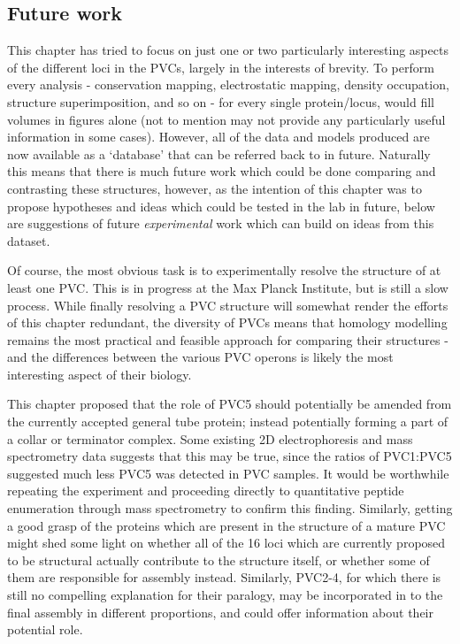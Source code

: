 \subsection{Future work}
This chapter has tried to focus on just one or two particularly interesting aspects of the different loci in the PVCs, largely in the interests of brevity. To perform every analysis - conservation mapping, electrostatic mapping, density occupation, structure superimposition, and so on - for every single protein/locus, would fill volumes in figures alone (not to mention may not provide any particularly useful information in some cases). However, all of the data and models produced are now available as a `database' that can be referred back to in future. Naturally this means that there is much future work which could be done comparing and contrasting these structures, however, as the intention of this chapter was to propose hypotheses and ideas which could be tested in the lab in future, below are suggestions of future \emph{experimental} work which can build on ideas from this dataset.

Of course, the most obvious task is to experimentally resolve the structure of at least one PVC. This is in progress at the Max Planck Institute, but is still a slow process. While finally resolving a PVC structure will somewhat render the efforts of this chapter redundant, the diversity of PVCs means that homology modelling remains the most practical and feasible approach for comparing their structures - and the differences between the various PVC operons is likely the most interesting aspect of their biology.

This chapter proposed that the role of PVC5 should potentially be amended from the currently accepted general tube protein; instead potentially forming a part of a collar or terminator complex. Some existing 2D electrophoresis and mass spectrometry data suggests that this may be true, since the ratios of PVC1:PVC5 suggested much less PVC5 was detected in PVC samples. It would be worthwhile repeating the experiment and proceeding directly to quantitative peptide enumeration through mass spectrometry to confirm this finding. Similarly, getting a good grasp of the proteins which are present in the structure of a mature PVC might shed some light on whether all of the 16 loci which are currently proposed to be structural actually contribute to the structure itself, or whether some of them are responsible for assembly instead. Similarly, PVC2-4, for which there is still no compelling explanation for their paralogy, may be incorporated in to the final assembly in different proportions, and could offer information about their potential role.

